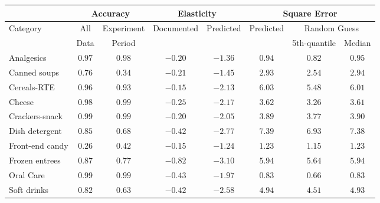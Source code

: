 {\small
\begin{center}
\begin{tabular}{l|cc|cc|ccc}
\hline\hline
\multicolumn{1}{l|}{ }&\multicolumn{2}{c|}{Accuracy}&\multicolumn{2}{c|}{Elasticity}&\multicolumn{3}{c}{Square Error}\tabularnewline
\hline
\multicolumn{1}{l|}{Category}&\multicolumn{1}{c}{All}&\multicolumn{1}{c|}{Experiment}&\multicolumn{1}{c}{Documented }&\multicolumn{1}{c|}{Predicted}&\multicolumn{1}{c}{Predicted}&\multicolumn{2}{c}{Random Guess}\tabularnewline
\multicolumn{1}{c}{ }&\multicolumn{1}{c}{Data}&\multicolumn{1}{c}{Period}&\multicolumn{1}{c}{ }&\multicolumn{1}{c}{ }&\multicolumn{1}{c}{ }&\multicolumn{1}{c}{5th-quantile}&\multicolumn{1}{c}{Median}\tabularnewline
\hline
Analgesics&$0.97$&$0.98$&$-0.20$&$-1.36$&$0.94$&$0.82$&$0.95$\tabularnewline
Canned soups&$0.76$&$0.34$&$-0.21$&$-1.45$&$2.93$&$2.54$&$2.94$\tabularnewline
Cereals-RTE&$0.96$&$0.93$&$-0.15$&$-2.13$&$6.03$&$5.48$&$6.01$\tabularnewline
Cheese&$0.98$&$0.99$&$-0.25$&$-2.17$&$3.62$&$3.26$&$3.61$\tabularnewline
Crackers-snack&$0.99$&$0.99$&$-0.20$&$-2.05$&$3.89$&$3.77$&$3.90$\tabularnewline
Dish detergent&$0.85$&$0.68$&$-0.42$&$-2.77$&$7.39$&$6.93$&$7.38$\tabularnewline
Front-end candy&$0.26$&$0.42$&$-0.15$&$-1.24$&$1.23$&$1.15$&$1.23$\tabularnewline
Frozen entrees&$0.87$&$0.77$&$-0.82$&$-3.10$&$5.94$&$5.64$&$5.94$\tabularnewline
Oral Care&$0.99$&$0.99$&$-0.43$&$-1.97$&$0.83$&$0.66$&$0.83$\tabularnewline
Soft drinks&$0.82$&$0.63$&$-0.42$&$-2.58$&$4.94$&$4.51$&$4.93$\tabularnewline
\hline
\end{tabular}\end{center}}
